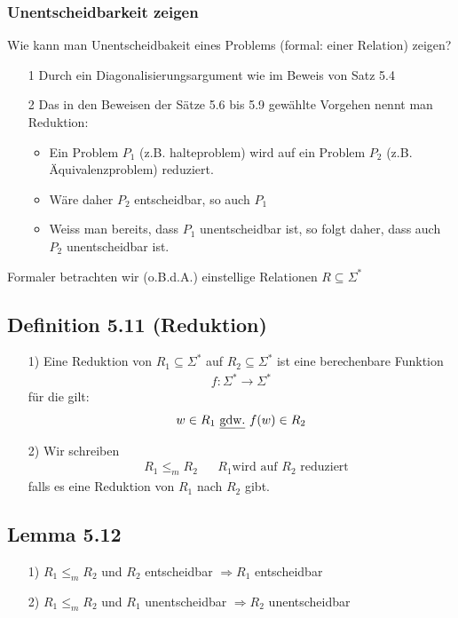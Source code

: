 \subsubsection{Unentscheidbarkeit zeigen}
Wie kann man Unentscheidbakeit eines Problems (formal: einer Relation) zeigen?
\begin{itemize}
	\item[1] Durch ein Diagonalisierungsargument wie im Beweis von Satz 5.4
	\item[2] Das in den Beweisen der Sätze 5.6 bis 5.9 gewählte Vorgehen nennt man Reduktion:
	\begin{itemize}
		\item Ein Problem $P_1$ (z.B. halteproblem) wird auf ein Problem $P_2$ (z.B. Äquivalenzproblem) reduziert.
		\item Wäre daher $P_2$ entscheidbar, so auch $P_1$
		\item Weiss man bereits, dass $P_1$ unentscheidbar ist, so folgt daher, dass auch $P_2$ unentscheidbar ist.
	\end{itemize}
\end{itemize}
Formaler betrachten wir (o.B.d.A.) einstellige Relationen $R \subseteq \Sigma^*$
\subsection{Definition 5.11 (Reduktion)}
\begin{itemize}
	\item[1)] Eine Reduktion von $R_1 \subseteq \Sigma^*$ auf $R_2 \subseteq \Sigma^*$ ist eine berechenbare Funktion
	\begin{align*}
		f: \Sigma^* \to \Sigma^*
	\end{align*}
	für die gilt:
	\begin{align*}
		w \in R_1 \text{ \underline{gdw.} } f(w) \in R_2
	\end{align*}
	\item[2)] Wir schreiben
	\begin{align*}
		&R_1 \leq_m R_2 &&R_1 \text{wird auf }R_2\text{ reduziert}
	\end{align*}
	falls es eine Reduktion von $R_1$ nach $R_2$ gibt.
\end{itemize}
\subsection{Lemma 5.12}
\begin{itemize}
	\item[1)] $R_1 \leq_m R_2$ und $R_2$ entscheidbar $\Rightarrow R_1$ entscheidbar
	\item[2)] $R_1 \leq_m R_2$ und $R_1$ unentscheidbar $\Rightarrow R_2$ unentscheidbar
\end{itemize}

